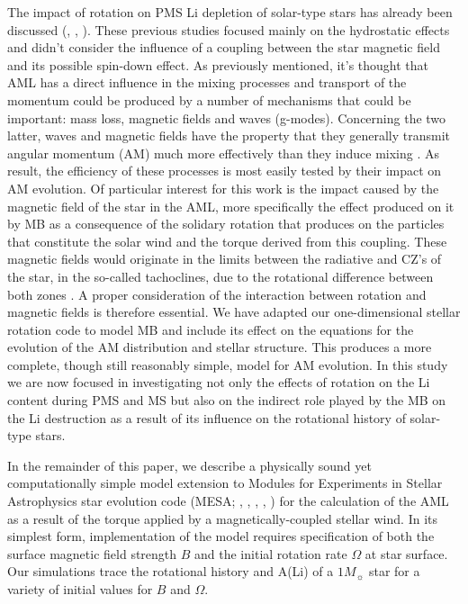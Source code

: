 \documentclass[fleqn,usenatbib]{mnras}
\begin{document}
The impact of rotation on PMS Li depletion of solar-type stars has already been discussed (\citet{Pinsonneault1997}, \citet{Jeffries2004}, \citet{Somers2014}). These previous studies focused mainly on the hydrostatic effects and didn't consider the influence of a coupling between the star magnetic field and its possible spin-down effect. As previously mentioned, it's thought that AML has a direct influence in the mixing processes and transport of the momentum could be produced by a number of mechanisms that could be important: mass loss, magnetic fields and waves (g-modes). Concerning the two latter, waves and magnetic fields have the property that they generally transmit angular momentum (AM) much more effectively than they induce mixing \citep{Denissenkov2007}. As result, the efficiency of these processes is most easily tested by their impact on AM evolution. Of particular interest for this work is the impact caused by the magnetic field of the star in the AML, more specifically the effect produced on it by MB as a consequence of the solidary rotation that produces on the particles that constitute the solar wind and the torque derived from this coupling. These magnetic fields would originate in the limits between the radiative and CZ's of the star, in the so-called tachoclines, due to the rotational difference between both zones \citep{Guerrero2016}. A proper consideration of the interaction between rotation and magnetic fields is therefore essential. We have adapted our one-dimensional stellar rotation code to model MB and include its effect on the equations for the evolution of the AM distribution and stellar structure. This produces a more complete, though still reasonably simple, model for AM evolution. In this study we are now focused in investigating not only the effects of rotation on the Li content during PMS and MS but also on the indirect role played by the MB on the Li destruction as a result of its influence on the rotational history of solar-type stars.\par

In the remainder of this paper, we describe a physically sound yet computationally simple model extension to Modules for Experiments in Stellar Astrophysics star evolution code (MESA; \citeauthor{Paxton2011} \citeyear{Paxton2011}, \citeyear{Paxton2013}, \citeyear{Paxton2015}, \citeyear{Paxton2018}, \citeyear{Paxton2019}) for the calculation of the AML as a result of the torque applied by a magnetically-coupled stellar wind. In its simplest form, implementation of the model requires specification of both the surface magnetic field strength $B$ and the initial  rotation rate $\Omega$ at star surface. Our simulations trace the rotational history and A(Li) of a $1 M_{\sun}$ star for a variety of initial values for $B$ and $\Omega$.\par
\end{document}
